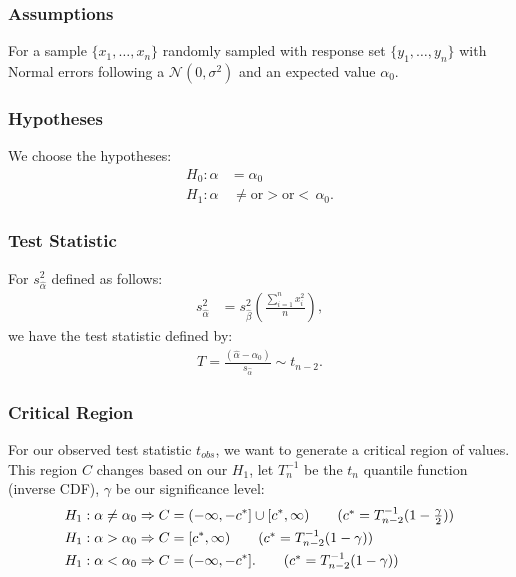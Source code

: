 \documentclass[a4paper, 12pt, twoside]{article}
\begin{document}
\subsubsection{Assumptions}

For a sample $\{x_1, \ldots, x_n\}$ randomly sampled with response
set $\{y_1, \ldots, y_n\}$ with Normal errors following a
$\mathcal{N}(0, \sigma^2)$ and an expected value $\alpha_0$.

\subsubsection{Hypotheses}

We choose the hypotheses:
\begin{align*}
    H_0 : \alpha & = \alpha_0                                   \\
    H_1 : \alpha & \, \neq \text{or} > \text{or} < \, \alpha_0.
\end{align*}

\subsubsection{Test Statistic}

For $s_{\hat\alpha}^2$ defined as follows:
\begin{align*}
    s_{\hat\alpha}^2 & = s_{\hat\beta}^2
    \left(\frac{\sum_{i = 1}^n x_i^2}{n}\right),
\end{align*}
we have the test statistic defined by:
\begin{align*}
    T = \frac{(\hat\alpha - \alpha_0)}{s_{\hat\alpha}}
    \sim t_{n - 2}.
\end{align*}

\subsubsection{Critical Region}

For our observed test statistic $t_{obs}$, we want to generate a
critical region of values. This region $C$ changes based on our
$H_1$, let $T^{-1}_n$ be the $t_n$ quantile function
(inverse CDF), $\gamma$ be our significance level:
\begin{align*}
    H_1 : \alpha \neq \alpha_0 & \Rightarrow
    C = (-\infty, -c^*] \cup [c^*, \infty)
    \tag{$ c^* = T_{n-2}^{-1}(1 - \frac{\gamma}{2}) $} \\
    H_1 : \alpha > \alpha_0    & \Rightarrow
    C = [c^*, \infty)
    \tag{$ c^* = T_{n-2}^{-1}(1 - \gamma) $}           \\
    H_1 : \alpha < \alpha_0    & \Rightarrow
    C = (-\infty, -c^*].
    \tag{$ c^* = T_{n-2}^{-1}(1 - \gamma) $}
\end{align*}
\end{document}
